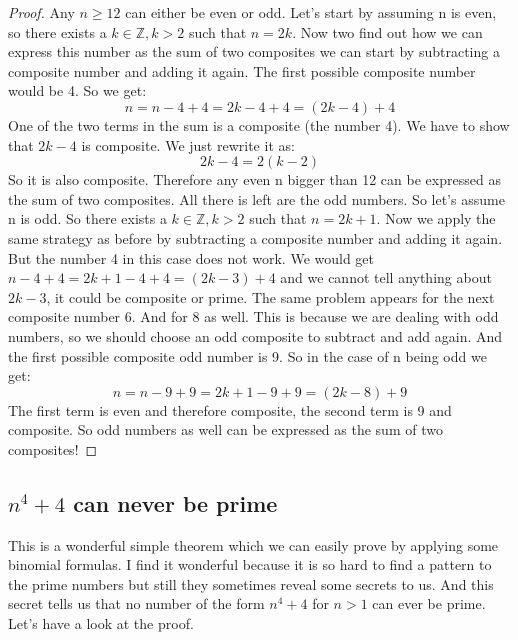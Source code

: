 \documentclass{article}
\theoremstyle{definition}
\begin{document}
\begin{proof}
Any $n\geq 12$ can either be even or odd. Let's start by assuming n is even, so there exists a $k\in \mathbb{Z}, k > 2$ such that $n = 2k$. Now two find out how we can express this number as the sum of two composites we can start by subtracting a composite number and adding it again. The first possible composite number would be 4. So we get:
\begin{equation}
    n = n - 4 + 4 = 2k - 4 + 4 = (2k-4) + 4
\end{equation}
One of the two terms in the sum is a composite (the number 4). We have to show that $2k-4$ is composite. We just rewrite it as:
\begin{equation}
    2k-4 = 2(k-2)
\end{equation}
So it is also composite. Therefore any even n bigger than 12 can be expressed as the sum of two composites. All there is left are the odd numbers.
So let's assume n is odd. So there exists a $k\in \mathbb{Z}, k > 2$ such that $n = 2k+1$. Now we apply the same strategy as before by subtracting a composite number and adding it again. But the number 4 in this case does not work. We would get $n-4+4=2k+1-4+4=(2k-3)+4$ and we cannot tell anything about $2k-3$, it could be composite or prime. The same problem appears for the next composite number 6. And for 8 as well. This is because we are dealing with odd numbers, so we should choose an odd composite to subtract and add again. And the first possible composite odd number is 9. So in the case of n being odd we get:
\begin{equation}
    n = n-9+9 = 2k+1 - 9 + 9 = (2k-8)+9
\end{equation}
The first term is even and therefore composite, the second term is 9 and composite. So odd numbers as well can be expressed as the sum of two composites!

\end{proof}



\subsection{$n^4 + 4$ can never be prime}
This is a wonderful simple theorem which we can easily prove by applying some binomial formulas. I find it wonderful because it is so hard to find a pattern to the prime numbers but still they sometimes reveal some secrets to us. And this secret tells us that no number of the form $n^4 +4 $ for $n>1$ can ever be prime. Let's have a look at the proof.
\end{document}
